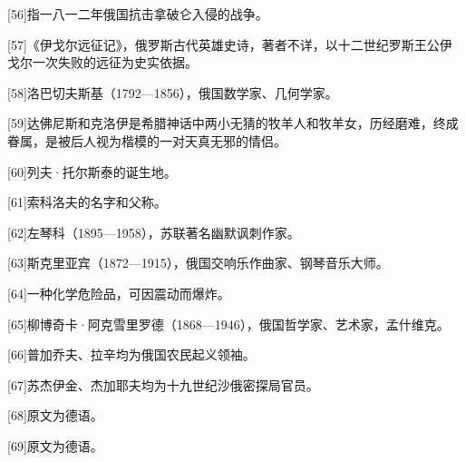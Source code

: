 [56]指一八一二年俄国抗击拿破仑入侵的战争。

[57]《伊戈尔远征记》，俄罗斯古代英雄史诗，著者不详，以十二世纪罗斯王公伊戈尔一次失败的远征为史实依据。

[58]洛巴切夫斯基（1792—1856），俄国数学家、几何学家。

[59]达佛尼斯和克洛伊是希腊神话中两小无猜的牧羊人和牧羊女，历经磨难，终成眷属，是被后人视为楷模的一对天真无邪的情侣。

[60]列夫·托尔斯泰的诞生地。

[61]索科洛夫的名字和父称。

[62]左琴科（1895—1958），苏联著名幽默讽刺作家。

[63]斯克里亚宾（1872—1915），俄国交响乐作曲家、钢琴音乐大师。

[64]一种化学危险品，可因震动而爆炸。

[65]柳博奇卡·阿克雪里罗德（1868—1946），俄国哲学家、艺术家，孟什维克。

[66]普加乔夫、拉辛均为俄国农民起义领袖。

[67]苏杰伊金、杰加耶夫均为十九世纪沙俄密探局官员。

[68]原文为德语。

[69]原文为德语。
